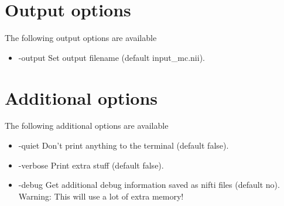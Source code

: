 \section{Output options}

The following output options are available

\begin{itemize}

\item -output 
\newline \newline Set output filename (default input\_mc.nii). 

\end{itemize}

\section{Additional options}

The following additional options are available

\begin{itemize}

\item -quiet 
\newline \newline Don't print anything to the terminal (default false). 

\item -verbose
\newline \newline Print extra stuff (default false).
 
\item -debug 
\newline \newline Get additional debug information saved as nifti files (default no). Warning: This will use a lot of extra memory! 

\end{itemize}


